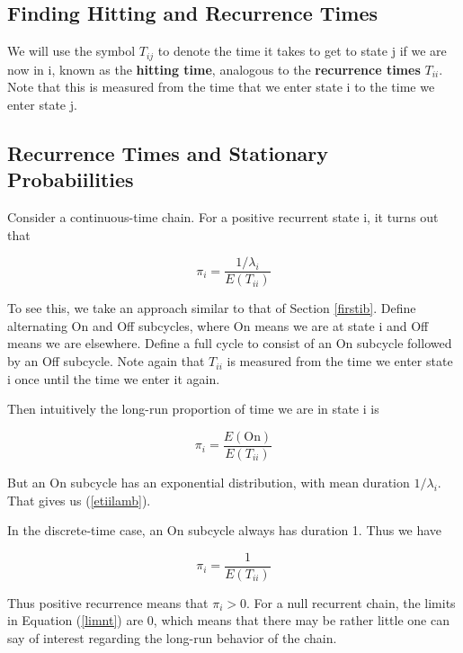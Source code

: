 \subsection{Finding Hitting and Recurrence Times}

We will use the symbol  $T_{ij}$ to denote the time it takes to get to
state j if we are now in i, known as the {\bf hitting time}, analogous
to the {\bf recurrence times} $T_{ii}$.  Note that this is measured from
the time that we enter state i to the time we enter state j.

\subsection{Recurrence Times and Stationary Probabiilities}

Consider a continuous-time chain.  For a positive recurrent state i, it
turns out that

\begin{equation}
\label{etiilamb}
\pi_{i}=\frac{1/\lambda_i}{E(T_{ii})}
\end{equation}

To see this, we take an approach similar to that of Section
\ref{firstib}.  Define alternating On and Off subcycles, where On means
we are at state i and Off means we are elsewhere.  Define a full cycle
to consist of an On subcycle followed by an Off subcycle.  Note again
that $T_{ii}$ is measured from the time we enter state i once until the
time we enter it again.  

Then intuitively the long-run proportion of time we are in state i is 

\begin{equation}
\pi_i = \frac{E(\textrm{On})}{E(T_{ii})} 
\end{equation}

But an On subcycle has an exponential distribution, with mean duration
$1/\lambda_i$.  That gives us (\ref{etiilamb}).

In the discrete-time case, an On subcycle always has duration 1.  Thus
we have

\begin{equation}
\label{etii}
\pi_i = \frac{1}{E(T_{ii})}
\end{equation}

Thus positive recurrence means that $\pi_{i}>0$. For a null recurrent
chain, the limits in Equation (\ref{limnt}) are 0, which means that
there may be rather little one can say of interest regarding the long-run
behavior of the chain.

